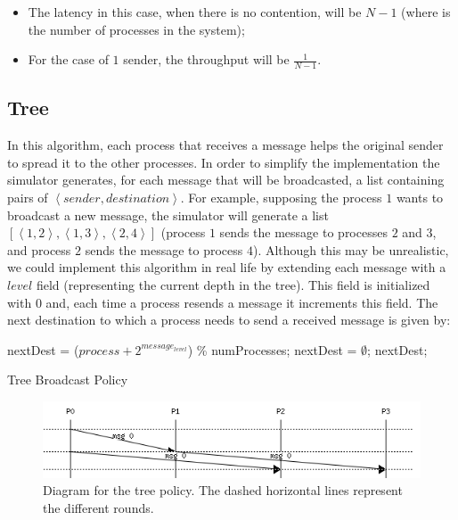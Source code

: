 \documentclass[a4paper, 11pt]{article}
\begin{document}
\begin{itemize}
	\item The latency in this case, when there is no contention, will be $N-1$ (where is the number of processes in the system);
	\item For the case of $1$ sender, the throughput will be $\frac{1}{N-1}$.
\end{itemize}

\subsection{Tree}
	In this algorithm, each process that receives a message helps the original sender to spread it to the other processes. In order to simplify the implementation the simulator generates, for each message that will be broadcasted, a list containing pairs of $\left<sender, destination\right>$. For example, supposing the process $1$ wants to broadcast a new message, the simulator will generate a list $[\left<1, 2\right>, \left<1, 3\right>, \left<2, 4\right>]$ (process $1$ sends the message to processes $2$ and $3$, and process $2$ sends the message to process $4$). Although this may be unrealistic, we could implement this algorithm in real life by extending each message with a $level$ field (representing the current depth in the tree). This field is initialized with $0$ and, each time a process resends a message it increments this field. The next destination to which a process needs to send a received message is given by:
	
\begin{algorithm}
\begin{algorithmic}
	\State nextDest = ($process + 2^{message_{level}}$) \% numProcesses;
		\State nextDest = $\emptyset$;
	\EndIf
	\State \Return nextDest;
\EndFunction
\end{algorithmic}
\caption{Tree Broadcast Policy}
\end{algorithm}

\begin{figure}[H]
	\centering
	\includegraphics[scale=0.9]{tree.PNG}
	\caption{Diagram for the tree policy. The dashed horizontal lines represent the different rounds.}
	\label{fig:diagramTree}
\end{figure}
\end{document}
